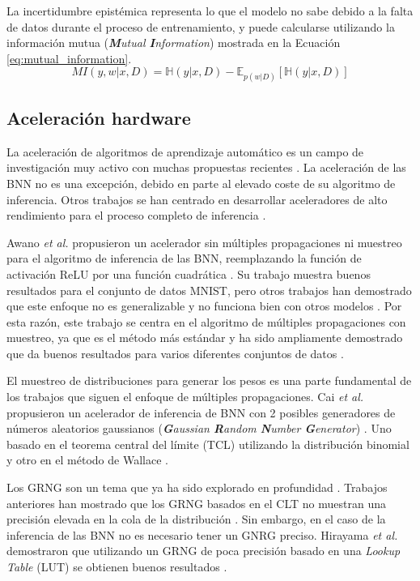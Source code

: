 La incertidumbre epistémica representa lo que el modelo no sabe debido a la falta de datos durante el proceso de entrenamiento, y puede calcularse utilizando la información mutua (\textit{\textbf{M}utual \textbf{I}nformation}) mostrada en la Ecuación \ref{eq:mutual_information}.
\begin{equation} \label{eq:mutual_information}
MI(y,w|x,D) = \mathbb{H}(y|x,D) - \mathbb{E}_{p(w|D)}[\mathbb{H}(y|x,D)]
\end{equation}

\subsection{Aceleración hardware}

La aceleración de algoritmos de aprendizaje automático es un campo de investigación muy activo con muchas propuestas recientes \cite{survey_ai22}. La aceleración de las BNN no es una excepción, debido en parte al elevado coste de su algoritmo de inferencia. Otros trabajos se han centrado en desarrollar aceleradores de alto rendimiento para el proceso completo de inferencia \cite{bnn_grng_accel, sampling_free_bnn_accel, bnn_clt_approx}.

Awano \emph{et al.} propusieron un acelerador sin múltiples propagaciones ni muestreo para el algoritmo de inferencia de las BNN, reemplazando la función de activación ReLU por una función cuadrática \cite{sampling_free_bnn_accel}. Su trabajo muestra buenos resultados para el conjunto de datos MNIST, pero otros trabajos han demostrado que este enfoque no es generalizable y no funciona bien con otros modelos \cite{bnn_clt_approx}. Por esta razón, este trabajo se centra en el algoritmo de múltiples propagaciones con muestreo, ya que es el método más estándar y ha sido ampliamente demostrado que da buenos resultados para varios diferentes conjuntos de datos \cite{bnn_grng_accel, bnn_clt_approx, bnn_hyper_uncertainty}.

El muestreo de distribuciones para generar los pesos es una parte fundamental de los trabajos que siguen el enfoque de múltiples propagaciones. Cai \emph{et al.} propusieron un acelerador de inferencia de BNN con 2 posibles generadores de números aleatorios gaussianos (\textit{\textbf{G}aussian \textbf{R}andom \textbf{N}umber \textbf{G}enerator}) \cite{bnn_grng_accel}. Uno basado en el teorema central del límite (TCL) utilizando la distribución binomial y otro en el método de Wallace \cite{wallace_grng}.

Los GRNG son un tema que ya ha sido explorado en profundidad \cite{grng_survey}. Trabajos anteriores han mostrado que los GRNG basados en el CLT no muestran una precisión elevada en la cola de la distribución \cite{clt_grng}. Sin embargo, en el caso de la inferencia de las BNN no es necesario tener un GNRG preciso. Hirayama \emph{et al.} demostraron que utilizando un GRNG de poca precisión basado en una \textit{Lookup Table} (LUT) se obtienen buenos resultados \cite{bnn_lut_grng}.

